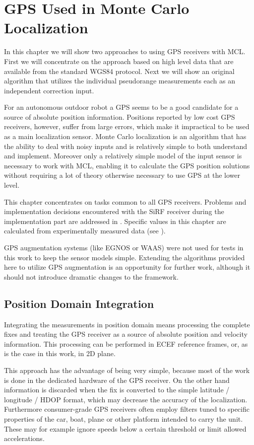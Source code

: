 \chapter{GPS Used in Monte Carlo Localization}
\label{chap:gps-and-mcl}

In this chapter we will show two approaches to using GPS receivers with MCL.
First we will concentrate on the approach based on high level data that are available
from the standard WGS84 protocol.
Next we will show an original algorithm that utilizes
the individual pseudorange measurements each as an independent correction input.

For an autonomous outdoor robot a GPS seems to be a good candidate for a source of
absolute position information.
Positions reported by low cost GPS receivers, however, suffer from large errors,
which make it impractical to be used as a main localization sensor.
Monte Carlo localization is an algorithm that has the ability to deal with noisy
inputs and is relatively simple to both understand and implement.
Moreover only a relatively simple model of the input sensor is necessary to work
with MCL, enabling it to calculate the GPS position solutions without requiring
a lot of theory otherwise necessary to use GPS at the lower level.

This chapter concentrates on tasks common to all GPS receivers.
Problems and implementation decisions encountered with the SiRF receiver
during the implementation part are addressed in .
Specific values in this chapter are calculated from experimentally measured data
(see ).

GPS augmentation systems (like EGNOS or WAAS) were not used for tests in this
work to keep the sensor models simple.
Extending the algorithms provided here to utilize GPS augmentation is an opportunity
for further work, although it should not introduce dramatic changes to the framework.

\section{Position Domain Integration}
\label{sec:position-domain}
Integrating the measurements in position domain means processing the complete
fixes and treating the GPS receiver as a source of absolute position and velocity information.
This processing can be performed in ECEF reference frames, or, as is the case in this work,
in 2D plane.

This approach has the advantage of being very simple, because most of the work
is done in the dedicated hardware of the GPS receiver.
On the other hand information is discarded when the fix is converted to the simple
latitude / longitude / HDOP format, which may decrease the accuracy of the
localization.
Furthermore consumer-grade GPS receivers often employ filters tuned to specific properties
of the car, boat, plane or other platform intended to carry the unit.
These may for example ignore speeds below a certain threshold or limit allowed accelerations.

